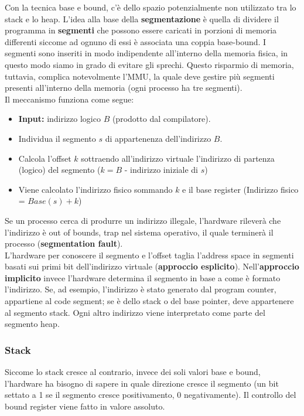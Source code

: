 \documentclass[12pt, twoside, letterpaper]{article}
\begin{document}
				Con la tecnica base e bound, c'è dello spazio potenzialmente non utilizzato tra lo stack e lo heap. L'idea alla base della \textbf{segmentazione} è quella di dividere il programma in \textbf{segmenti} che possono essere caricati in porzioni di memoria differenti siccome ad ognuno di essi è associata una coppia base-bound. I segmenti sono inseriti in modo indipendente all'interno della memoria fisica, in questo modo siamo in grado di evitare gli sprechi. Questo risparmio di memoria, tuttavia, complica notevolmente l'MMU, la quale deve gestire più segmenti presenti all'interno della memoria (ogni processo ha tre segmenti).\\
				Il meccanismo funziona come segue:
				\begin{itemize}
					\item \textbf{Input:} indirizzo logico $B$ (prodotto dal compilatore).
					\item Individua il segmento $s$ di appartenenza dell'indirizzo $B$.
					\item Calcola l'offset $k$ sottraendo all'indirizzo virtuale l'indirizzo di partenza (logico) del segmento ($k = B$ - indirizzo iniziale di $s$)
					\item Viene calcolato l'indirizzo fisico sommando $k$ e il base register (Indirizzo fisico = $Base(s)+k$)
				\end{itemize}
				Se un processo cerca di produrre un indirizzo illegale, l'hardware rileverà che l'indirizzo è out of bounds, trap nel sistema operativo, il quale terminerà il processo (\textbf{segmentation fault}).\\
				L'hardware per conoscere il segmento e l'offset taglia l'address space in segmenti basati sui primi bit dell'indirizzo virtuale (\textbf{approccio esplicito}). Nell'\textbf{approccio implicito} invece l'hardware determina il segmento in base a come è formato l'indirizzo. Se, ad esempio, l'indirizzo è stato generato dal program counter, appartiene al code segment; se è dello stack o del base pointer, deve appartenere al segmento stack. Ogni altro indirizzo viene interpretato come parte del segmento heap.
			
			\subsubsection{Stack}
				Siccome lo stack cresce al contrario, invece dei soli valori base e bound, l'hardware ha bisogno di sapere in quale direzione cresce il segmento (un bit settato a 1 se il segmento cresce positivamento, 0 negativamente). Il controllo del bound register viene fatto in valore assoluto.
				
\end{document}
